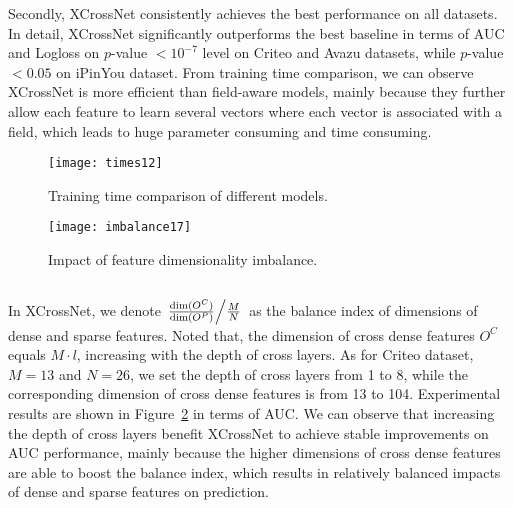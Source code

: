 \documentclass[letterpaper]{article} \usepackage{aaai21}  \usepackage{times}  \usepackage{helvet} \usepackage{courier}  \usepackage[hyphens]{url}  \usepackage{graphicx} \urlstyle{rm} \def\UrlFont{\rm}  \usepackage{natbib}  \usepackage{caption} \frenchspacing  \setlength{\pdfpagewidth}{8.5in}  \setlength{\pdfpageheight}{11in}  \usepackage{graphicx}
\begin{document}
Secondly, XCrossNet consistently achieves the best performance on all datasets. In detail, XCrossNet significantly outperforms the best baseline in terms of AUC and Logloss on $p$-value $<10^{-7}$ level on Criteo and Avazu datasets, while $p$-value $<0.05$ on iPinYou dataset. From training time comparison, we can observe XCrossNet is more efficient than field-aware models, mainly because they further allow each feature to learn several vectors where each vector is associated with a field, which leads to huge parameter consuming and time consuming.


\begin{figure}[!t]
	\centering
	\texttt{[image: times12]} \vspace{-0.6cm}
	\caption{Training time comparison of different models.}
	\label{fig3}
	\vspace{-0.2cm}
\end{figure}

\begin{figure}[!t]
	\centering
	\texttt{[image: imbalance17]} \vspace{-0.3cm}
	\caption{Impact of feature dimensionality imbalance.}
	\label{fig4}
	\vspace{-0.5cm}
\end{figure}


\vspace{-0.1cm}
\subsection{\fontsize{10.4pt}{13pt} \selectfont{Feature Dimensionality Imbalance Study (RQ2)}}
\vspace{-0.1cm}
In XCrossNet, we denote $\left.{  \frac{\dim (O^C)} {\dim (O^P) } } \middle/ { \frac{M}{N} }\right.$ as the balance index of dimensions of dense and sparse features.
Noted that, the dimension of cross dense features $O^C$ equals $M\cdot l$, increasing with the depth of cross layers. As for Criteo dataset, $M=13$ and $N=26$, we set the depth of cross layers from 1 to 8, while the corresponding dimension of cross dense features is from 13 to 104. Experimental results are shown in Figure~\ref{fig4} in terms of AUC. We can observe that increasing the depth of cross layers benefit XCrossNet to achieve stable improvements on AUC performance, mainly because the higher dimensions of cross dense features are able to boost the balance index, which results in relatively balanced impacts of dense and sparse features on prediction.
\end{document}
